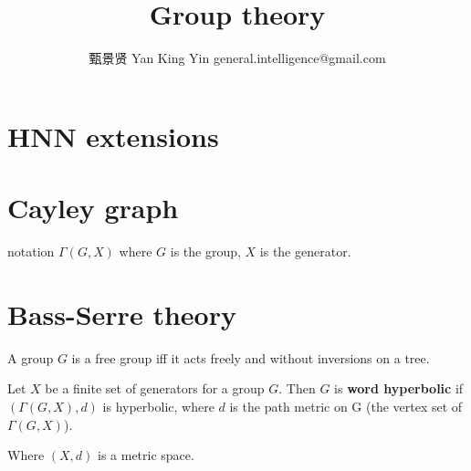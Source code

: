 

\title{Group theory}
\author{甄景贤 Yan King Yin {\footnotesize general.intelligence@gmail.com}}


	
\maketitle

\section{HNN extensions}

\section{Cayley graph}

notation $\Gamma(G,X)$ where $G$ is the group, $X$ is the generator.

\section{Bass-Serre theory}

A group $G$ is a free group iff it acts freely and without inversions on a tree.

Let $X$ be a finite set of generators for a group $G$.  Then $G$ is \textbf{word hyperbolic} if $(\Gamma(G,X), d)$ is hyperbolic, where $d$ is the path metric on G (the vertex set of $\Gamma(G, X)$).  

Where $(X,d)$ is a metric space.



